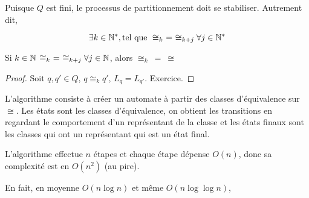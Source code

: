 \begin{remarque}
	Puisque $Q$ est fini, le processus de partitionnement doit se stabiliser. Autrement dit,

	$$\exists k \in \mathbb{N}^*, \text{tel que } \cong_{k} \ = \ \cong_{k+j} \forall j \in \mathbb{N}^* $$
\end{remarque}


\begin{prop}
	Si $k \in \mathbb{N}$ \tq $ \cong_k \ = \ \cong_{k+j} \forall j \in \mathbb{N}$, alors $\cong_k \ = \ \cong$
\end{prop}

\begin{proof}
	Soit $q,q' \in Q$, $q \cong_k q'$, \mq $L_q = L_{q'}$. Exercice.
\end{proof}

\begin{definition}
	L'algorithme consiste à créer un automate à partir des classes d'équivalence sur $\cong$.
	Les états sont les classes d'équivalence, on obtient les transitions en regardant le comportement
	d'un représentant de la classe et les états finaux sont les classes qui ont un représentant qui est un état final.
\end{definition}


\begin{complexite}
	L'algorithme effectue $n$ étapes et chaque étape dépense $O(n)$, donc sa complexité est en $O(n^2)$ (au pire).

	En fait, en moyenne $O(n \log n)$ et même $O(n \log \log n)$,  \cite{David2010TheAC}
\end{complexite}


